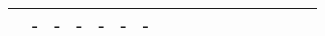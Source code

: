 \begin{table}
\begin{adjustbox}{totalheight=\baselineskip,}
\begin{tabular}{ccccclp{2em}cp{3em}cp{2em}p{4em}p{3em}p{3.5em}p{3.5em}p{2.5em}p{3em}}
                                           &\multirow{1}{*}{-}
                                               &\multirow{1}{*}{-}
                                                   &\multirow{1}{*}{-}
                                                       &\multirow{1}{*}{-}
                                                           &\multirow{1}{*}{-}
                                                               &\multirow{1}{*}{-}\\
\bottomrule 
\end{tabular}
\end{adjustbox}
\end{table}